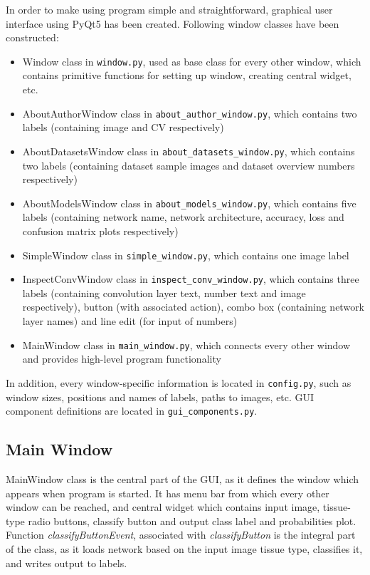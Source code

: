 In order to make using program simple and straightforward, graphical user interface using PyQt5 has been created. Following window classes have been constructed:
\begin{itemize}
	\itemsep 0em
	\item Window class in \texttt{window.py}, used as base class for every other window, which contains primitive functions for setting up window, creating central widget, etc.
	\item AboutAuthorWindow class in \texttt{about\_author\_window.py}, which contains two labels (containing image and CV respectively)
	\item AboutDatasetsWindow class in \texttt{about\_datasets\_window.py}, which contains two labels (containing dataset sample images and dataset overview numbers respectively)
	\item AboutModelsWindow class in \texttt{about\_models\_window.py}, which contains five labels (containing network name, network architecture, accuracy, loss and confusion matrix plots respectively)
	\item SimpleWindow class in \texttt{simple\_window.py}, which contains one image label
	\item InspectConvWindow class in \texttt{inspect\_conv\_window.py}, which contains three labels (containing convolution layer text, number text and image respectively), button (with associated action), combo box (containing network layer names)  and line edit (for input of numbers)
	\item MainWindow class in \texttt{main\_window.py}, which connects every other window and provides high-level program functionality 
\end{itemize}
In addition, every window-specific information is located in \texttt{config.py}, such as window sizes, positions and names of labels, paths to images, etc. GUI component definitions are located in \texttt{gui\_components.py}.

\subsection{Main Window}

MainWindow class is the central part of the GUI, as it defines the window which appears when program is started. It has menu bar from which every other window can be reached, and central widget which contains input image, tissue-type radio buttons, classify button and output class label and probabilities plot. Function \emph{classifyButtonEvent}, associated with \emph{classifyButton} is the integral part of the class, as it loads network based on the input image tissue type, classifies it, and writes output to labels.


